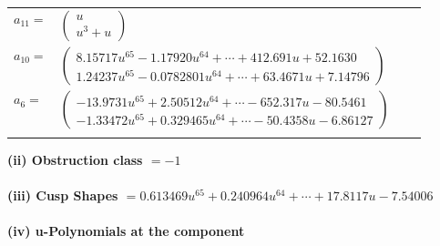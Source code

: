 \documentclass[1p]{elsarticle_modified}
\theoremstyle{definition}
\begin{document}
\begin{tabular}{m{7pt} m{180pt} m{7pt} m{180pt} }
\flushright $a_{11}=$&$\begin{pmatrix}u\\u^3+u\end{pmatrix}$ \\
\flushright $a_{10}=$&$\begin{pmatrix}8.15717 u^{65}-1.17920 u^{64}+\cdots+412.691 u+52.1630\\1.24237 u^{65}-0.0782801 u^{64}+\cdots+63.4671 u+7.14796\end{pmatrix}$ \\
\flushright $a_{6}=$&$\begin{pmatrix}-13.9731 u^{65}+2.50512 u^{64}+\cdots-652.317 u-80.5461\\-1.33472 u^{65}+0.329465 u^{64}+\cdots-50.4358 u-6.86127\end{pmatrix}$\\&\end{tabular}
\flushleft \textbf{(ii) Obstruction class $= -1$}\\~\\
\flushleft \textbf{(iii) Cusp Shapes $= 0.613469 u^{65}+0.240964 u^{64}+\cdots+17.8117 u-7.54006$}\\~\\
\newpage\renewcommand{\arraystretch}{1}
\flushleft \textbf{(iv) u-Polynomials at the component}\newline \\
\end{document}
